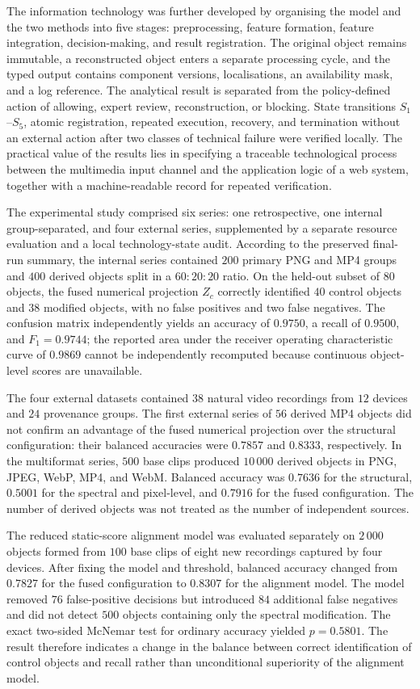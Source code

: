 The information technology was further developed by organising the model and the two methods into five stages: preprocessing, feature formation, feature integration, decision-making, and result registration. The original object remains immutable, a reconstructed object enters a separate processing cycle, and the typed output contains component versions, localisations, an availability mask, and a log reference. The analytical result is separated from the policy-defined action of allowing, expert review, reconstruction, or blocking. State transitions $S_1$--$S_5$, atomic registration, repeated execution, recovery, and termination without an external action after two classes of technical failure were verified locally. The practical value of the results lies in specifying a traceable technological process between the multimedia input channel and the application logic of a web system, together with a machine-readable record for repeated verification.

The experimental study comprised six series: one retrospective, one internal group-separated, and four external series, supplemented by a separate resource evaluation and a local technology-state audit. According to the preserved final-run summary, the internal series contained $200$ primary PNG and MP4 groups and $400$ derived objects split in a $60:20:20$ ratio. On the held-out subset of $80$ objects, the fused numerical projection $Z_c$ correctly identified $40$ control objects and $38$ modified objects, with no false positives and two false negatives. The confusion matrix independently yields an accuracy of $0.9750$, a recall of $0.9500$, and $F_1=0.9744$; the reported area under the receiver operating characteristic curve of $0.9869$ cannot be independently recomputed because continuous object-level scores are unavailable.

The four external datasets contained $38$ natural video recordings from $12$ devices and $24$ provenance groups. The first external series of $56$ derived MP4 objects did not confirm an advantage of the fused numerical projection over the structural configuration: their balanced accuracies were $0.7857$ and $0.8333$, respectively. In the multiformat series, $500$ base clips produced $10\,000$ derived objects in PNG, JPEG, WebP, MP4, and WebM. Balanced accuracy was $0.7636$ for the structural, $0.5001$ for the spectral and pixel-level, and $0.7916$ for the fused configuration. The number of derived objects was not treated as the number of independent sources.

The reduced static-score alignment model was evaluated separately on $2\,000$ objects formed from $100$ base clips of eight new recordings captured by four devices. After fixing the model and threshold, balanced accuracy changed from $0.7827$ for the fused configuration to $0.8307$ for the alignment model. The model removed $76$ false-positive decisions but introduced $84$ additional false negatives and did not detect $500$ objects containing only the spectral modification. The exact two-sided McNemar test for ordinary accuracy yielded $p=0.5801$. The result therefore indicates a change in the balance between correct identification of control objects and recall rather than unconditional superiority of the alignment model.

